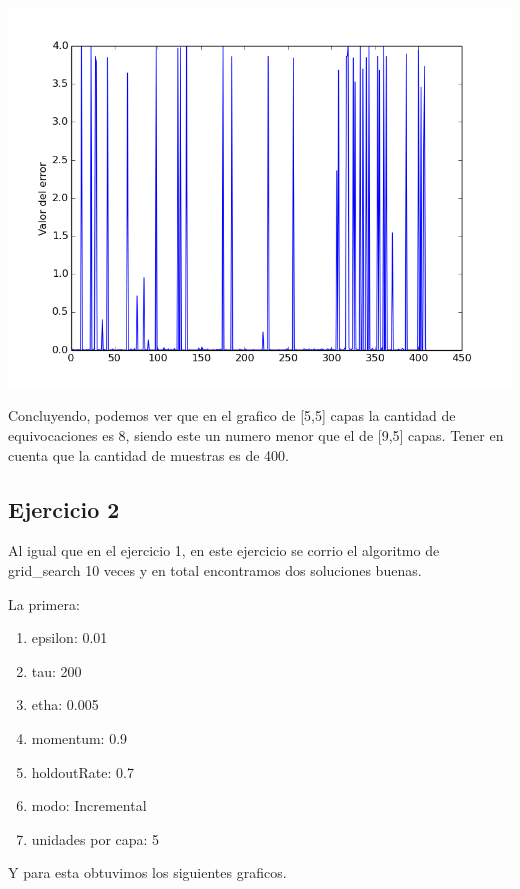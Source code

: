 \begin{center}
\includegraphics[scale=0.5]{img/ej195_histograma}
\end{center}

Concluyendo, podemos ver que en el grafico de [5,5] capas la cantidad de equivocaciones es 8, siendo este un numero menor que el de [9,5] capas. Tener en cuenta que la cantidad de muestras es de 400.

\subsection{Ejercicio 2}

Al igual que en el ejercicio 1, en este ejercicio se corrio el algoritmo de grid\_search 10 veces y en total encontramos dos  soluciones buenas. 

La primera:

\begin{enumerate}
\item epsilon: 0.01
\item tau: 200
\item etha: 0.005
\item momentum: 0.9
\item holdoutRate: 0.7
\item modo: Incremental
\item unidades por capa: 5
\end{enumerate}

Y para esta obtuvimos los siguientes graficos.

